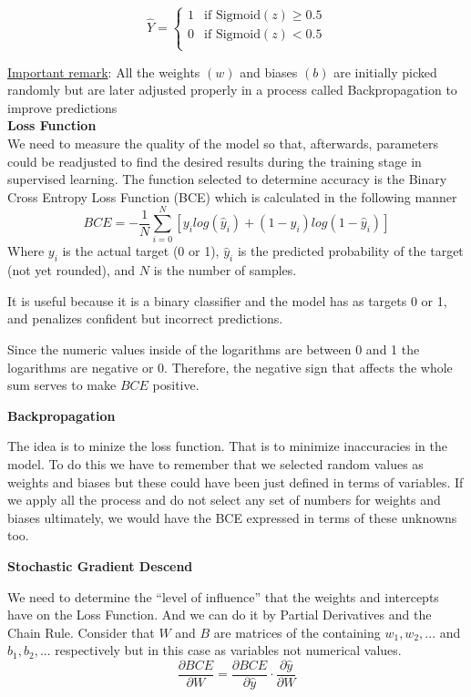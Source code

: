 \documentclass[12pt]{article}
\begin{document}
\[
\hat{Y} = 
\begin{cases} 
   1 & \text{if } \text{Sigmoid}(z) \geq 0.5 \\
   0 & \text{if } \text{Sigmoid}(z) < 0.5 \\
\end{cases}
\]

\underline{Important remark}: All the weights $(w)$ and biases $(b)$ are initially picked randomly but are later adjusted properly in a process called Backpropagation to improve predictions\\
\textbf{Loss Function}\\
We need to measure the quality of the model so that, afterwards, parameters could be readjusted to find the desired results during the training stage in supervised learning.
The function selected to determine accuracy is the Binary Cross Entropy Loss Function (BCE) which is calculated in the following manner
\begin{equation}
    BCE = -\frac{1}{N}\sum_{i = 0}^{N}[y_ilog(\hat{y}_i)+(1-y_i)log(1-\hat{y}_i)]
\end{equation}
Where $y_i$ is the actual target (0 or 1), $\hat{y}_i$ is the predicted probability of the target (not yet rounded), and $N$ is the number of samples.

It is useful because it is a binary classifier and the model has as targets 0 or 1, and penalizes confident but incorrect predictions.

Since the numeric values inside of the logarithms are between 0 and 1 the logarithms are negative or 0. Therefore, the negative sign that affects the whole sum serves to make $BCE$ positive.

\textbf{Backpropagation}

The idea is to minize the loss function. That is to minimize inaccuracies in the model. To do this we have to remember that we selected random values as weights and biases
but these could have been just defined in terms of variables. If we apply all the process and do not select any set of numbers for weights and biases ultimately, we would have the BCE expressed in terms of these unknowns too.

\textbf{Stochastic Gradient Descend}

We need to determine the ``level of influence'' that the weights and intercepts have on the Loss Function. And we can do it by Partial Derivatives and the Chain Rule. Consider that $W$ and $B$ are matrices of the containing $w_1, w_2, ... $ and $b_1, b_2, ... $ respectively but in this case as variables not numerical values.
\begin{equation}
    \frac{\partial BCE}{\partial W} = \frac{\partial BCE}{\partial \hat{y}} \cdot \frac{\partial \hat{y}}{\partial W}
\end{equation}
\end{document}
